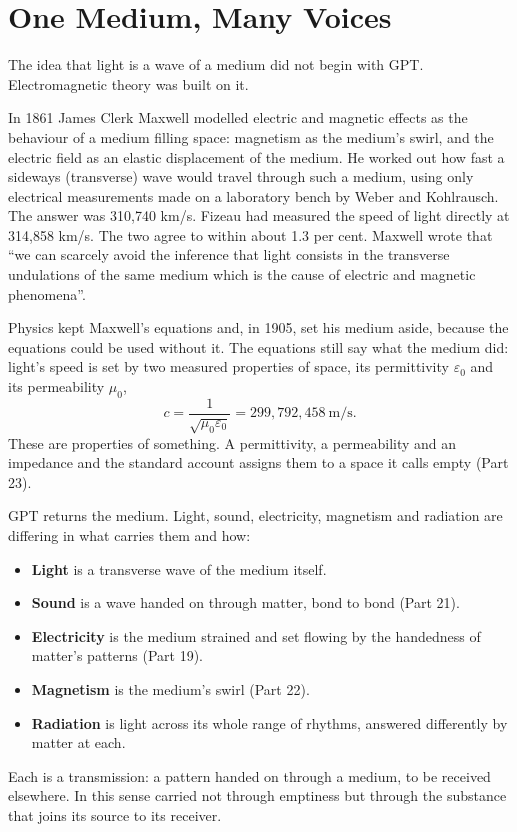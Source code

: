 \documentclass[11pt,a4paper]{article}
\begin{document}
\section{One Medium, Many Voices}

The idea that light is a wave of a medium did not begin with GPT. Electromagnetic theory was built on it.

In 1861 James Clerk Maxwell modelled electric and magnetic effects as the behaviour of a medium filling space: magnetism as the medium's swirl, and the electric field as an elastic displacement of the medium. He worked out how fast a sideways (transverse) wave would travel through such a medium, using only electrical measurements made on a laboratory bench by Weber and Kohlrausch. The answer was 310,740 km/s. Fizeau had measured the speed of light directly at 314,858 km/s. The two agree to within about 1.3 per cent. Maxwell wrote that ``we can scarcely avoid the inference that light consists in the transverse undulations of the same medium which is the cause of electric and magnetic phenomena''.

Physics kept Maxwell's equations and, in 1905, set his medium aside, because the equations could be used without it. The equations still say what the medium did: light's speed is set by two measured properties of space, its permittivity $\varepsilon_0$ and its permeability $\mu_0$,
\begin{equation}
c = \frac{1}{\sqrt{\mu_0\varepsilon_0}} = 299{,}792{,}458~\text{m/s}.
\end{equation}
These are properties of something. A permittivity, a permeability and an impedance  and the standard account assigns them to a space it calls empty (Part 23).

GPT returns the medium. Light, sound, electricity, magnetism and radiation are  differing in what carries them and how:
\begin{itemize}
\item \textbf{Light} is a transverse wave of the medium itself.
\item \textbf{Sound} is a wave handed on through matter, bond to bond (Part 21).
\item \textbf{Electricity} is the medium strained and set flowing by the handedness of matter's patterns (Part 19).
\item \textbf{Magnetism} is the medium's swirl (Part 22).
\item \textbf{Radiation} is light across its whole range of rhythms, answered differently by matter at each.
\end{itemize}
Each is a transmission: a pattern handed on through a medium, to be received elsewhere. In this sense  carried not through emptiness but through the substance that joins its source to its receiver.
\end{document}
